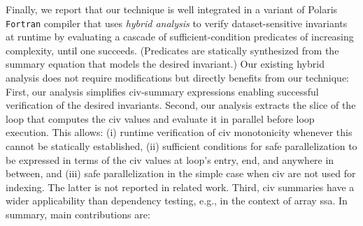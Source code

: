 \documentclass{sig-alternate}
\begin{document}
\enlargethispage{\baselineskip}


Finally, we report that our technique is well integrated %
in a variant of Polaris~\cite{Blume94automaticdetection} 
{\tt Fortran} compiler that uses {\em hybrid analysis} to
verify dataset-sensitive invariants %
at runtime by evaluating a cascade of sufficient-condition 
predicates of increasing complexity, until one succeeds. 
(Predicates are statically synthesized from the summary 
equation that models the desired invariant.)
%
Our existing hybrid analysis does not require modifications
but directly benefits from our technique: 
%
First, our analysis simplifies {\sc civ}-summary expressions
enabling successful verification of the desired invariants.
Second, our analysis extracts the slice of the loop that computes
the {\sc civ} values and evaluate it in parallel before loop
execution. This allows: 
  (i) runtime verification of {\sc civ} monotonicity whenever 
          this cannot be statically established, 
 (ii) sufficient conditions for safe parallelization to 
          be expressed in terms of the {\sc civ} values at loop's 
          entry, end, and anywhere in between, and 
(iii) safe parallelization in the simple case when
        {\sc civ} are not used for indexing.
The latter is not reported in related work.
%
Third, {\sc civ} summaries have a wider applicability than 
dependency testing, e.g., in the context of array {\sc ssa}.
%
In summary, main contributions are:
\end{document}
